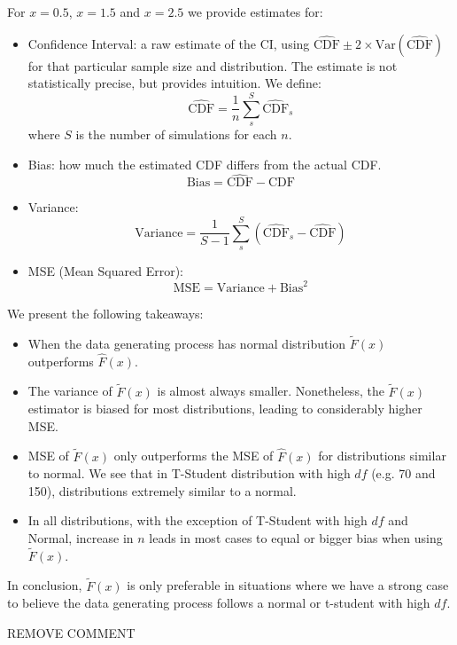 \documentclass{article}
\newenvironment{colorparagraph}[1]{\par\color{#1}}{\par}
\begin{document}
For $x = 0.5$, $x = 1.5$ and $x = 2.5$ we provide estimates for:
\begin{itemize}
  \item Confidence Interval: a raw estimate of the CI, using $\hat{\text{CDF}} \pm 2 \times \text{Var}(\hat{\text{CDF}})$ for that particular sample size and distribution. The estimate is not statistically precise, but provides intuition.
  We define:
  $$
  \hat{\text{CDF}} = \frac{1}{n} \sum_s^{S} \hat{\text{CDF}}_s
  $$
  where $S$ is the number of simulations for each $n$.
  \item Bias: how much the estimated CDF differs from the actual CDF.
  $$
  \text{Bias} = \hat{\text{CDF}} - {\text{CDF}}
  $$
  \item Variance: 
  $$
  \text{Variance} = \frac{1}{S-1} \sum_s^{S} \left(\hat{\text{CDF}}_s - \hat{\text{CDF}}\right)
  $$
  \item MSE (Mean Squared Error): 
  $$
  \text{MSE} = \text{Variance} + \text{Bias}^2
  $$
\end{itemize}

We present the following takeaways:
\begin{itemize}
  \item When the data generating process has normal distribution $\tilde{F}(x)$ outperforms $\hat{F}(x)$.
  \item The variance of $\tilde{F}(x)$ is almost always smaller. Nonetheless, the  $\tilde{F}(x)$ estimator is biased for most distributions, leading to considerably higher MSE.
  \item MSE of $\tilde{F}(x)$ only outperforms the MSE of $\hat{F}(x)$ for distributions similar to normal. We see that in T-Student distribution with high $df$ (e.g. 70 and 150), distributions extremely similar to a normal.
  \item In all distributions, with the exception of T-Student with high $df$ and Normal, increase in $n$ leads in most cases to equal or bigger bias when using $\tilde{F}(x)$.
\end{itemize}

In conclusion, $\tilde{F}(x)$ is only preferable in situations where we have a strong case to believe the data generating process follows a normal or t-student with high $df$.

\begin{colorparagraph}{tacolor}
  REMOVE COMMENT
\end{colorparagraph}
\end{document}
